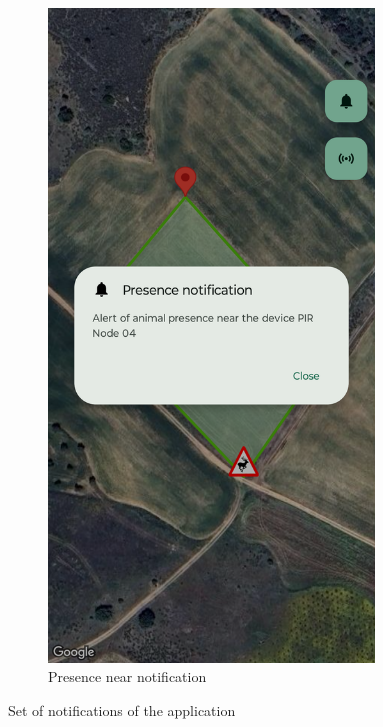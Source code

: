 \begin{enumerate}
\begin{figure}[H]
\begin{subfigure}[t]{0.3\textwidth}
                \includegraphics[width=0.95\textwidth]{images/8/17.png}
                \caption{Presence near notification}
            \end{subfigure}
            \caption{Set of notifications of the application}
            \label{fig:AppNotifications}
        \end{figure}
\end{enumerate}